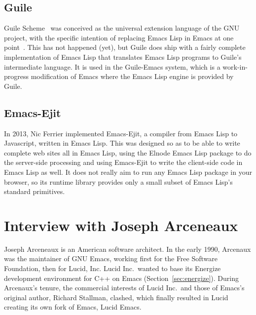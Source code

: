 \documentclass[format=acmsmall,screen]{acmart}
\newcommand \Elisp {Emacs Lisp}
\begin{document}
\subsection{Guile}

Guile Scheme~\cite{Guile2020}   %
was conceived as the universal extension
language of the GNU project, with the specific intention of replacing
\Elisp{} in Emacs at one point~\cite{WhyNotTcl}.  This has not happened (yet), but Guile does
ship with a fairly complete implementation of \Elisp{} that translates
\Elisp{} programs to Guile's intermediate language.  It is used in the
Guile-Emacs system, which is a work-in-progress modification of Emacs where
the \Elisp{} engine is provided by Guile.

\subsection{Emacs-Ejit}

In 2013, Nic Ferrier implemented Emacs-Ejit, a compiler from \Elisp{} to
Javascript, written in \Elisp{}.  This was designed so as to be able to write complete web sites
all in \Elisp{}, using the Elnode \Elisp{} package to do the server-side
processing and using Emacs-Ejit to write the client-side code in \Elisp{}
as well.  It does not really aim to run any \Elisp{} package in your
browser, so its runtime library provides only a small subset of \Elisp's
standard primitives.

\section{Interview with Joseph Arceneaux}
\label{appendix:arceneaux}
\newenvironment{question}{\begin{quote}\itshape}{\end{quote}}

Joseph Arceneaux is an American software architect. In the early 1990,
Arcenaux was the maintainer of GNU Emacs, working first for the Free
Software Foundation, then for Lucid, Inc.  Lucid Inc.\ wanted to base
its Energize development environment for C++ on Emacs (Section~\ref{sec:energize}).
During Arcenaux's tenure, the commercial interests of Lucid Inc.\ and those
of Emacs's original author, Richard Stallman, clashed, which finally
resulted in Lucid creating its own fork of Emacs, Lucid Emacs.
\end{document}
